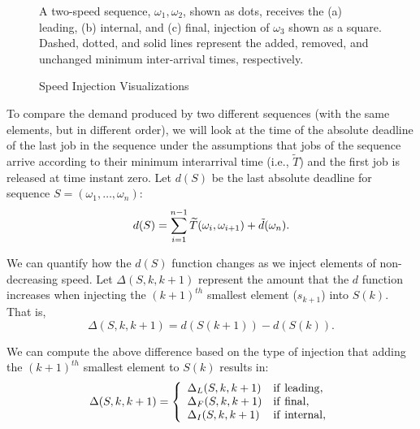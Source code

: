 \begin{figure}
      \label{fig:injFEI}
  \label{injFEI}
\caption{Speed Injection Visualizations} A two-speed sequence, $\omega_1, \omega_2$, shown as dots, receives the (a) leading, (b) internal, and (c) final, injection of $\omega_3$ shown as a square. Dashed, dotted, and solid lines represent the added, removed, and unchanged minimum inter-arrival times, respectively.
\label{fig:injections}
\end{figure}

To compare the demand produced by two different sequences (with the same elements, but in different order), we will look at the time of the absolute deadline of the last job in the sequence under the assumptions that jobs of the sequence arrive according to their minimum interarrival time (i.e., $\widetilde{T}$) and the first job is released at time instant zero.   Let $d(S)$ be the last absolute deadline for sequence $S = (\omega_1, \ldots, \omega_n)$:
\begin{equation} \label{eq:speedSequenceTimeImplicitDeadline}
d(S) = \sum\limits_{i=1}^{n-1} \widetilde{T}(\omega_i,\omega_{i+1}) + \Tilde{d}(\omega_n).
\end{equation}

We can quantify how the $d(S)$ function changes as we inject elements of non-decreasing speed.  Let $\Delta(S, k, k+1)$ represent the amount that the $d$ function increases when injecting the $(k+1)^{th}$ smallest element ($s_{k+1}$) into $S(k)$.  That is,
\begin{equation} \label{eq:seq-delta}
\Delta(S, k, k+1) = d(S(k+1)) - d(S(k)).
\end{equation}

We can compute the above difference based on the type of injection that adding the $(k+1)^{th}$ smallest element to $S(k)$ results in:
\begin{equation} \label{eq:seq-delta-types}
\Delta(S, k, k+1) = \left\{
    \begin{array}{ll}
         \Delta_L (S, k, k+1)&{\rm if~leading},  \\
         \Delta_F (S, k, k+1)&{\rm if~final},\\
        \Delta_I (S, k, k+1)&{\rm if~internal},
    \end{array}
\right.
\end{equation}

